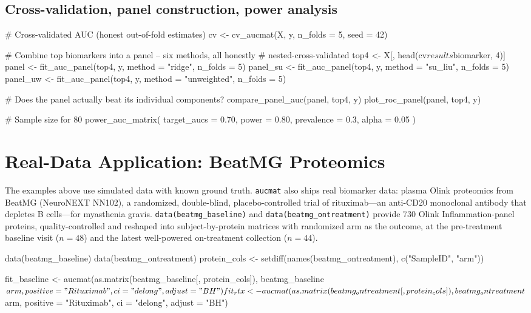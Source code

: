 \documentclass[11pt,a4paper]{article}
\begin{document}
\subsection{Cross-validation, panel construction, power analysis}

\begin{CodeBlock}
# Cross-validated AUC (honest out-of-fold estimates)
cv <- cv_aucmat(X, y, n_folds = 5, seed = 42)

# Combine top biomarkers into a panel -- six methods, all honestly
# nested-cross-validated
top4 <- X[, head(cv$results$biomarker, 4)]
panel    <- fit_auc_panel(top4, y, method = "ridge",      n_folds = 5)
panel_su <- fit_auc_panel(top4, y, method = "su_liu",     n_folds = 5)
panel_uw <- fit_auc_panel(top4, y, method = "unweighted", n_folds = 5)

# Does the panel actually beat its individual components?
compare_panel_auc(panel, top4, y)
plot_roc_panel(panel, top4, y)

# Sample size for 80%
power_auc_matrix(
  target_aucs = 0.70, power = 0.80,
  prevalence = 0.3, alpha = 0.05
)
\end{CodeBlock}

\section{Real-Data Application: BeatMG Proteomics}

The examples above use simulated data with known ground truth.
\texttt{aucmat} also ships real biomarker data: plasma Olink proteomics from
BeatMG (NeuroNEXT NN102), a randomized, double-blind, placebo-controlled
trial of rituximab---an anti-CD20 monoclonal antibody that depletes B
cells---for myasthenia gravis.  \texttt{data(beatmg\_baseline)} and
\texttt{data(beatmg\_ontreatment)} provide 730 Olink Inflammation-panel
proteins, quality-controlled and reshaped into subject-by-protein matrices
with randomized arm as the outcome, at the pre-treatment baseline visit
($n = 48$) and the latest well-powered on-treatment collection ($n = 44$).

\begin{CodeBlock}
data(beatmg_baseline)
data(beatmg_ontreatment)
protein_cols <- setdiff(names(beatmg_ontreatment), c("SampleID", "arm"))

fit_baseline <- aucmat(as.matrix(beatmg_baseline[, protein_cols]),
  beatmg_baseline$arm, positive = "Rituximab", ci = "delong", adjust = "BH")
fit_rtx <- aucmat(as.matrix(beatmg_ontreatment[, protein_cols]),
  beatmg_ontreatment$arm, positive = "Rituximab", ci = "delong", adjust = "BH")
\end{CodeBlock}
\end{document}
